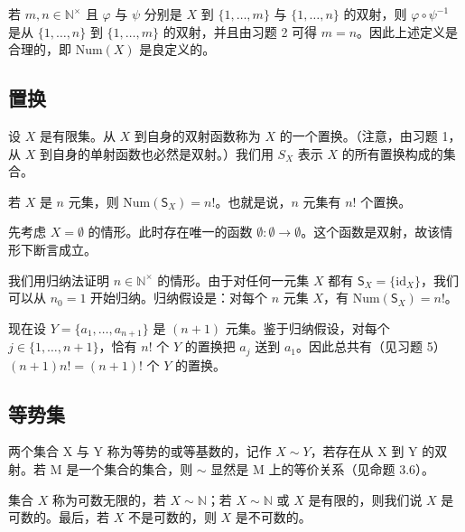 \begin{remark}

若 $m, n \in \mathbb{N}^\times$ 且 $\varphi$ 与 $\psi$ 分别是 $X$ 到 $\{1, \ldots, m\}$ 与 $\{1, \ldots, n\}$ 的双射，则 $\varphi \circ \psi^{-1}$ 是从 $\{1, \ldots, n\}$ 到 $\{1, \ldots, m\}$ 的双射，并且由习题 2 可得 $m = n$。因此上述定义是合理的，即 $\text{Num}(X)$ 是良定义的。

\end{remark}

\subsection*{置换}

设 $X$ 是有限集。从 $X$ 到自身的双射函数称为 $X$ 的一个置换。（注意，由习题 1，从 $X$ 到自身的单射函数也必然是双射。）我们用 $S_X$ 表示 $X$ 的所有置换构成的集合。

\begin{proposition}

若 $X$ 是 $n$ 元集，则 $\text{Num}(\mathsf{S}_X) = n!$。也就是说，$n$ 元集有 $n!$ 个置换。

\proofhead
先考虑 $ X = \emptyset $ 的情形。此时存在唯一的函数 $ \emptyset: \emptyset \to \emptyset $。这个函数是双射，故该情形下断言成立。

我们用归纳法证明 $ n \in \mathbb{N}^\times $ 的情形。由于对任何一元集 $ X $ 都有 $ \mathsf{S}_X = \{\mathrm{id}_X\} $，我们可以从 $ n_0 = 1 $ 开始归纳。归纳假设是：对每个 $ n $ 元集 $ X $，有 $ \mathrm{Num}(\mathsf{S}_X) = n! $。

现在设 $Y = \{a_1, \ldots, a_{n+1}\}$ 是 $(n+1)$ 元集。鉴于归纳假设，对每个 $j \in \{1, \ldots, n+1\}$，恰有 $n$! 个 $Y$ 的置换把 $a_j$ 送到 $a_1$。因此总共有（见习题 5）$(n+1)n! = (n+1)!$ 个 $Y$ 的置换。
\end{proposition}

\subsection*{等势集}

两个集合 X 与 Y 称为等势的或等基数的，记作 $ X \sim Y $，若存在从 X 到 Y 的双射。若 M 是一个集合的集合，则 $ \sim $ 显然是 M 上的等价关系（见命题 3.6）。

集合 $X$ 称为可数无限的，若 $X \sim \mathbb{N}$；若 $X \sim \mathbb{N}$ 或 $X$ 是有限的，则我们说 $X$ 是可数的。最后，若 $X$ 不是可数的，则 $X$ 是不可数的。

